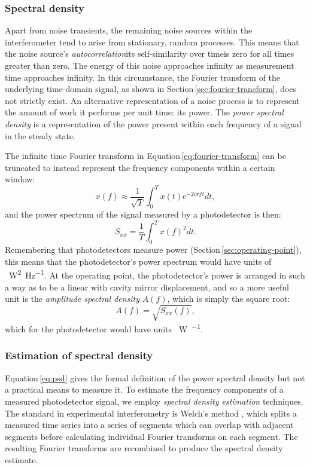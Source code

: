 \subsubsection{Spectral density}
Apart from noise transients, the remaining noise sources within the interferometer tend to arise from stationary, random processes. This means that the noise source's \emph{autocorrelation}\textemdash its self-similarity over time\textemdash is zero for all times greater than zero. The energy of this noise approaches infinity as measurement time approaches infinity. In this circumstance, the Fourier transform of the underlying time-domain signal, as shown in Section\,\ref{sec:fourier-transform}, does not strictly exist. An alternative representation of a noise process is to represent the amount of work it performs per unit time: its power. The \emph{power spectral density} is a representation of the power present within each frequency of a signal in the steady state.

The infinite time Fourier transform in Equation\,\ref{eq:fourier-transform} can be truncated to instead represent the frequency components within a certain window:
\begin{equation}
  x \left( f \right) \approx \frac{1}{\sqrt{T}} \int^{T}_{0} x \left( t \right) \text{e}^{-2i \pi f t} dt,
\end{equation}
and the power spectrum of the signal measured by a photodetector is then:
\begin{equation}
  \label{eq:psd}
  S_{xx} = \frac{1}{T} \int^{T}_{0} x \left( f \right)^2 dt.
\end{equation}
Remembering that photodetectors measure power (Section\,\ref{sec:operating-point}), this means that the photodetector's power spectrum would have units of \SI{}{\watt^2\per\hertz}. At the operating point, the photodetector's power is arranged in such a way as to be a linear with cavity mirror displacement, and so a more useful unit is the \emph{amplitude spectral density} $A \left( f \right)$, which is simply the square root:
\begin{equation}
  A \left( f \right) = \sqrt{S_{xx} \left( f \right)},
\end{equation}
which for the photodetector would have units \SI{}{\watt\per\sqrthz}.

\subsubsection{Estimation of spectral density}
Equation\,\ref{eq:psd} gives the formal definition of the power spectral density but not a practical means to measure it. To estimate the frequency components of a measured photodetector signal, we employ \emph{spectral density estimation} techniques. The standard in experimental interferometry is Welch's method \cite{Welch1967}, which splits a measured time series into a series of segments which can overlap with adjacent segments before calculating individual Fourier transforms on each segment. The resulting Fourier transforms are recombined to produce the spectral density estimate.

